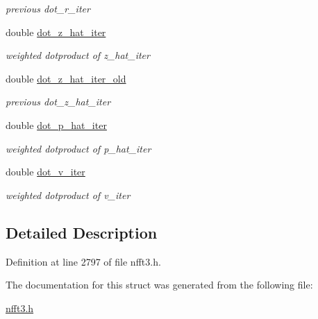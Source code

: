 \begin{CompactItemize}
\begin{CompactList}\small\item\em previous dot\_\-r\_\-iter \item\end{CompactList}\item 
\hypertarget{structsolver__plan__complex_ba91d7700d200a0b15cecf8aafcef0df}{
double \hyperlink{structsolver__plan__complex_ba91d7700d200a0b15cecf8aafcef0df}{dot\_\-z\_\-hat\_\-iter}}
\label{structsolver__plan__complex_ba91d7700d200a0b15cecf8aafcef0df}

\begin{CompactList}\small\item\em weighted dotproduct of z\_\-hat\_\-iter \item\end{CompactList}\item 
\hypertarget{structsolver__plan__complex_adb97426a0e35fd46a65557c56b055ee}{
double \hyperlink{structsolver__plan__complex_adb97426a0e35fd46a65557c56b055ee}{dot\_\-z\_\-hat\_\-iter\_\-old}}
\label{structsolver__plan__complex_adb97426a0e35fd46a65557c56b055ee}

\begin{CompactList}\small\item\em previous dot\_\-z\_\-hat\_\-iter \item\end{CompactList}\item 
\hypertarget{structsolver__plan__complex_0cced7bb2f3b85b75b765d796e2c741d}{
double \hyperlink{structsolver__plan__complex_0cced7bb2f3b85b75b765d796e2c741d}{dot\_\-p\_\-hat\_\-iter}}
\label{structsolver__plan__complex_0cced7bb2f3b85b75b765d796e2c741d}

\begin{CompactList}\small\item\em weighted dotproduct of p\_\-hat\_\-iter \item\end{CompactList}\item 
\hypertarget{structsolver__plan__complex_0561b1d4bd014a175ef75d069cc592de}{
double \hyperlink{structsolver__plan__complex_0561b1d4bd014a175ef75d069cc592de}{dot\_\-v\_\-iter}}
\label{structsolver__plan__complex_0561b1d4bd014a175ef75d069cc592de}

\begin{CompactList}\small\item\em weighted dotproduct of v\_\-iter \item\end{CompactList}\end{CompactItemize}


\subsection{Detailed Description}


Definition at line 2797 of file nfft3.h.

The documentation for this struct was generated from the following file:\begin{CompactItemize}
\item 
\hyperlink{nfft3_8h}{nfft3.h}\end{CompactItemize}
